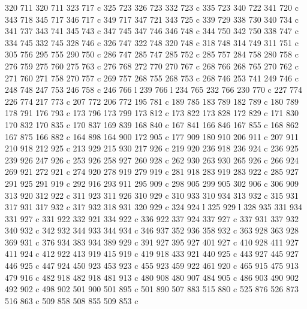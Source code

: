 {{        320 711 320 711 323 717 c
        325 723 326 723 332 723 c
        335 723 340 722 341 720 c
        343 718 345 717 346 717 c
        349 717 347 721 343 725 c
        339 729 338 730 340 734 c
        341 737 343 741 345 743 c
        347 745 347 746 346 748 c
        344 750 342 750 338 747 c
        334 745 332 745 328 746 c
        326 747 322 748 320 748 c
        318 748 314 749 311 751 c
        305 756 295 755 290 750 c
        286 747 285 747 285 752 c
        285 757 284 758 280 758 c
        276 759 275 760 275 763 c
        276 768 272 770 270 767 c
        268 766 268 765 270 762 c
        271 760 271 758 270 757 c
        269 757 268 755 268 753 c
        268 746 253 741 249 746 c
        248 748 247 753 246 758 c
        246 766 l
        239 766 l
        234 765 232 766 230 770 c
        227 774 226 774 217 773 c
        207 772 206 772 195 781 c
        189 785 183 789 182 789 c
        180 789 178 791 176 793 c
        173 796 173 799 173 812 c
        173 822 173 828 172 829 c
        171 830 170 832 170 835 c
        170 837 169 839 168 840 c
        167 841 166 846 167 855 c
        168 862 167 875 166 882 c
        164 898 164 900 172 905 c
        177 909 180 910 206 911 c
        207 911 210 918 212 925 c
        213 929 215 930 217 926 c
        219 920 236 918 236 924 c
        236 925 239 926 247 926 c
        253 926 258 927 260 928 c
        262 930 263 930 265 926 c
        266 924 269 921 272 921 c
        274 920 278 919 279 919 c
        281 918 283 919 283 922 c
        285 927 291 925 291 919 c
        292 916 293 911 295 909 c
        298 905 299 905 302 906 c
        306 909 313 920 312 922 c
        311 923 311 926 310 929 c
        310 933 310 934 313 932 c
        315 931 317 931 317 932 c
        317 932 318 931 320 929 c
        324 924 l
        325 929 l
        328 935 331 934 331 927 c
        331 922 332 921 334 922 c
        336 922 337 924 337 927 c
        337 931 337 932 340 932 c
        342 932 344 933 344 934 c
        346 937 352 936 358 932 c
        363 928 363 928 369 931 c
        376 934 383 934 389 929 c
        391 927 395 927 401 927 c
        410 928 411 927 411 924 c
        412 922 413 919 415 919 c
        419 918 433 921 440 925 c
        443 927 445 927 446 925 c
        447 924 450 923 453 923 c
        455 923 459 922 461 920 c
        465 915 475 913 479 916 c
        482 918 482 918 481 913 c
        480 908 480 907 484 905 c
        486 903 490 902 492 902 c
        498 902 501 900 501 895 c
        501 890 507 883 515 880 c
        525 876 526 873 516 863 c
        509 858 508 855 509 853 c
}}
